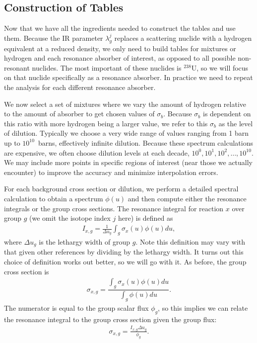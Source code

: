 \subsection{Construction of Tables}

Now that we have all the ingredients needed to construct the tables and use them. Because the IR parameter $\lambda_g^j$ replaces a scattering nuclide with a hydrogen equivalent at a reduced density, we only need to build tables for mixtures or hydrogen and each resonance absorber of interest, as opposed to all possible non-resonant nuclides. The most important of these nuclides is $^{238}$U, so we will focus on that nuclide specifically as a resonance absorber. In practice we need to repeat the analysis for each different resonance absorber.

We now select a set of mixtures where we vary the amount of hydrogen relative to the amount of absorber to get chosen values of $\sigma_b$. Because $\sigma_b$ is dependent on this ratio with more hydrogen being a larger value, we refer to this $\sigma_b$ as the level of dilution. Typically we choose a very wide range of values ranging from 1 barn up to $10^{10}$~barns, effectively infinite dilution. Because these spectrum calculations are expensive, we often choose dilution levels at each decade, $10^0, 10^1, 10^2, \ldots, 10^{10}$. We may include more points in specific regions of interest (near those we actually encounter) to improve the accuracy and minimize interpolation errors.

For each background cross section or dilution, we perform a detailed spectral calculation to obtain a spectrum $\phi(u)$ and then compute either the resonance integrals or the group cross sections. The resonance integral for reaction $x$ over group $g$ (we omit the isotope index $j$ here) is defined as
\begin{align}
  I_{x,g} = \frac{1}{\Delta u_g} \int_g \sigma_x(u) \phi(u) du ,
\end{align}
where $\Delta u_g$ is the lethargy width of group $g$. Note this definition may vary with that given other references by dividing by the lethargy width. It turns out this choice of definition works out better, so we will go with it. As before, the group cross section is
\begin{align}
  \sigma_{x,g} = \dfrac{ \displaystyle\int_g \sigma_x(u) \phi(u) du  }{ \displaystyle\int_g \phi(u) du } .
\end{align}
The numerator is equal to the group scalar flux $\phi_g$, so this implies we can relate the resonance integral to the group cross section given the group flux:
\begin{align}
   \sigma_{x,g} = \frac{ I_{x,g} \Delta u_g }{ \phi_g } . \label{Eq:libaryGeneration_relation_groupFlux_resonanceIntegral}
\end{align}

